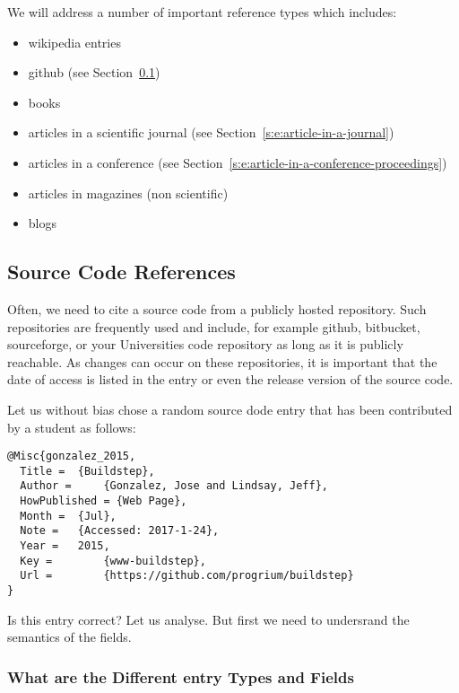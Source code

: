 We will address a number of important reference types which includes:

\begin{itemize}

\item
  wikipedia entries
\item
  github (see Section~\ref{s:e:source-code-references})
\item
  books
\item
  articles in a scientific journal (see Section~\ref{s:e:article-in-a-journal})
\item
  articles in a conference (see Section~\ref{s:e:article-in-a-conference-proceedings})
\item
  articles in magazines (non scientific)
\item
  blogs
\end{itemize}

\subsection{Source Code References}
\label{s:e:source-code-references}

Often, we need to cite a source code from a publicly hosted
repository. Such repositories are frequently used and include, for
example github, bitbucket, sourceforge, or your Universities code
repository as long as it is publicly reachable. As changes can occur on
these repositories, it is important that the date of access is listed in
the entry or even the release version of the source code.

Let us without bias chose a random source dode entry that has been
contributed by a student as follows:

\begin{verbatim}
@Misc{gonzalez_2015,
  Title =  {Buildstep},
  Author =     {Gonzalez, Jose and Lindsay, Jeff},
  HowPublished = {Web Page},
  Month =  {Jul},
  Note =   {Accessed: 2017-1-24},
  Year =   2015,
  Key =        {www-buildstep},
  Url =        {https://github.com/progrium/buildstep}
}
\end{verbatim}

Is this entry correct? Let us analyse. But first we need to undersrand
the semantics of the fields.

\subsubsection{What are the Different entry Types and Fields}

